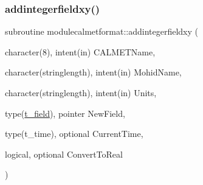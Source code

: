 \subsubsection{\texorpdfstring{addintegerfieldxy()}{addintegerfieldxy()}}
{\footnotesize\ttfamily subroutine modulecalmetformat\+::addintegerfieldxy (\begin{DoxyParamCaption}\item[{character(8), intent(in)}]{C\+A\+L\+M\+E\+T\+Name,  }\item[{character(stringlength), intent(in)}]{Mohid\+Name,  }\item[{character(stringlength), intent(in)}]{Units,  }\item[{type(\mbox{\hyperlink{structmodulecalmetformat_1_1t__field}{t\+\_\+field}}), pointer}]{New\+Field,  }\item[{type(t\+\_\+time), optional}]{Current\+Time,  }\item[{logical, optional}]{Convert\+To\+Real }\end{DoxyParamCaption})\hspace{0.3cm}{\ttfamily [private]}}

